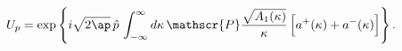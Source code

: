 \begin{equation}
U_p=\exp\left\{i\sqrt{2\ap}\,\hat{p}\,
\int_{-\infty}^{\infty}d\kappa\,
\mathscr{P}\frac{\sqrt{A_1(\kappa)}}{\kappa}\,
\Bigl[a^{+}(\kappa)+a^{-}(\kappa)\Bigr]\right\}.
\label{U}
\end{equation}

